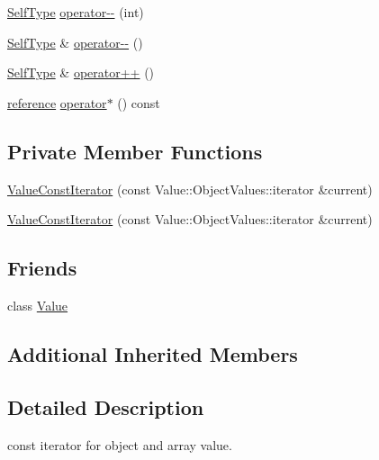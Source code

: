 \begin{DoxyCompactItemize}
\hyperlink{classJson_1_1ValueIteratorBase_a9d2a940d03ea06d20d972f41a89149ee}{Self\-Type} \hyperlink{classJson_1_1ValueConstIterator_a94935961e9331c6f7b907b05ec8df75e}{operator-\/-\/} (int)
\item 
\hyperlink{classJson_1_1ValueIteratorBase_a9d2a940d03ea06d20d972f41a89149ee}{Self\-Type} \& \hyperlink{classJson_1_1ValueConstIterator_a31415e44e44e56fb2bfda7e8bb784646}{operator-\/-\/} ()
\item 
\hyperlink{classJson_1_1ValueIteratorBase_a9d2a940d03ea06d20d972f41a89149ee}{Self\-Type} \& \hyperlink{classJson_1_1ValueConstIterator_a2cfe2f7a94a688186efdafb1b181c319}{operator++} ()
\item 
\hyperlink{classJson_1_1ValueConstIterator_aa9b05c6a37cd352ea1ee6e13b816f709}{reference} \hyperlink{classJson_1_1ValueConstIterator_aeb44153d71c61ac9397a84d5ecc244c5}{operator$\ast$} () const 
\end{DoxyCompactItemize}
\subsection*{Private Member Functions}
\begin{DoxyCompactItemize}
\item 
\hyperlink{classJson_1_1ValueConstIterator_aa0a87edf5f1097f91dca5f2a389c4abd}{Value\-Const\-Iterator} (const Value\-::\-Object\-Values\-::iterator \&current)
\item 
\hyperlink{classJson_1_1ValueConstIterator_aa0a87edf5f1097f91dca5f2a389c4abd}{Value\-Const\-Iterator} (const Value\-::\-Object\-Values\-::iterator \&current)
\end{DoxyCompactItemize}
\subsection*{Friends}
\begin{DoxyCompactItemize}
\item 
class \hyperlink{classJson_1_1ValueConstIterator_a896c037a32087c5c20d97e64a1786880}{Value}
\end{DoxyCompactItemize}
\subsection*{Additional Inherited Members}


\subsection{Detailed Description}
const iterator for object and array value. 



